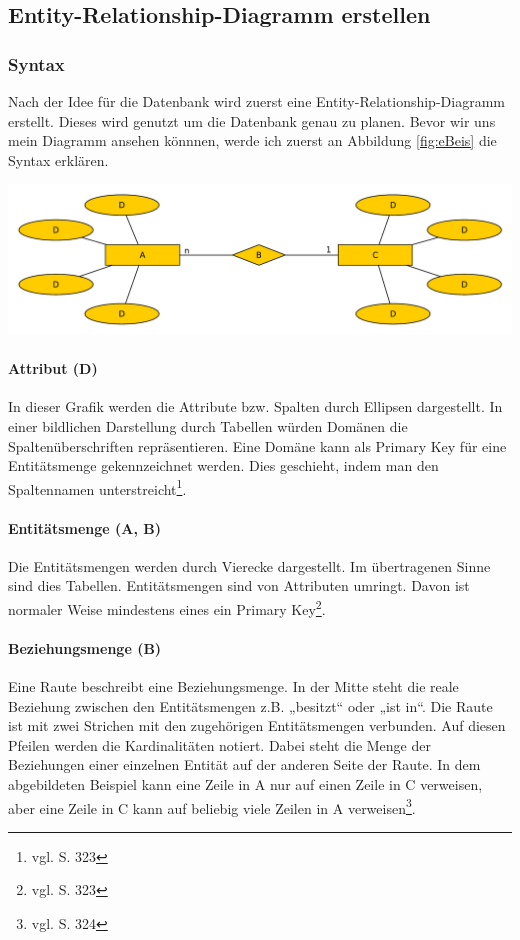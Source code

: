 \documentclass[a4paper, 12pt]{article}
\theoremstyle{plain}
\theoremstyle{definition}
\begin{document}
	\subsection{Entity-Relationship-Diagramm erstellen}
	\label{sec:ERDers}
	\subsubsection{Syntax}
	\label{sec:ERSyntax}
	Nach der Idee für die Datenbank wird zuerst eine Entity-Relationship-Diagramm erstellt. Dieses wird genutzt um die Datenbank genau zu planen. Bevor wir uns mein Diagramm ansehen könnnen, werde ich zuerst an Abbildung \ref{fig:eBeis} die Syntax erklären.
	\begin{center}
	\includegraphics[scale=0.6, ]{EntityBeis.pdf}
	\label{fig:eBeis}
	\end{center}
	
	\paragraph{Attribut (D)} In dieser Grafik werden die Attribute bzw. Spalten durch Ellipsen dargestellt. In einer bildlichen Darstellung durch Tabellen würden Domänen die Spaltenüberschriften repräsentieren. Eine Domäne kann als Primary Key für eine Entitätsmenge gekennzeichnet werden. Dies geschieht, indem man den Spaltennamen unterstreicht\footnote{vgl. \cite{Info2} S. 323}.
	
	\paragraph{Entitätsmenge (A, B)} Die Entitätsmengen werden durch Vierecke dargestellt. Im übertragenen Sinne sind dies Tabellen. Entitätsmengen sind von Attributen umringt. Davon ist normaler Weise mindestens eines ein Primary Key\footnote{vgl. \cite{Info2} S. 323}.
	
	\paragraph{Beziehungsmenge (B)} Eine Raute beschreibt eine Beziehungsmenge. In der Mitte steht die reale Beziehung zwischen den Entitätsmengen z.B. „besitzt“ oder „ist in“. Die Raute ist mit zwei Strichen mit den zugehörigen Entitätsmengen verbunden.  Auf diesen Pfeilen werden die Kardinalitäten notiert. Dabei steht die Menge der Beziehungen einer einzelnen Entität auf der anderen Seite der Raute. In dem abgebildeten Beispiel kann eine Zeile in A nur auf einen Zeile in C verweisen, aber eine Zeile in C kann auf beliebig viele Zeilen in A verweisen\footnote{vgl. \cite{Info2} S. 324}. 
\end{document}
